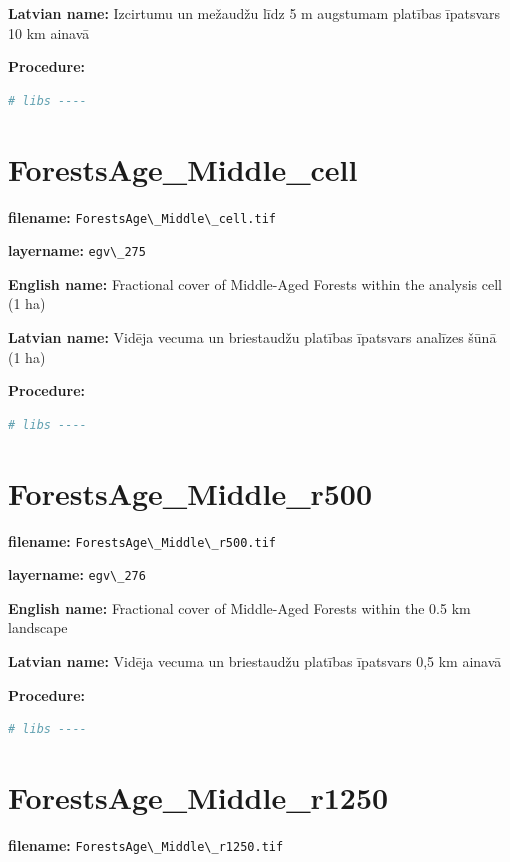 \documentclass[
]{book}
\newcommand{\passthrough}[1]{#1}
\begin{document}
\textbf{Latvian name:} Izcirtumu un mežaudžu līdz 5 m augstumam platības īpatsvars 10 km ainavā

\textbf{Procedure:}

\begin{lstlisting}[language=R]
# libs ----
\end{lstlisting}

\section{ForestsAge\_Middle\_cell}\label{ch06.275}

\textbf{filename:} \passthrough{\lstinline!ForestsAge\_Middle\_cell.tif!}

\textbf{layername:} \passthrough{\lstinline!egv\_275!}

\textbf{English name:} Fractional cover of Middle-Aged Forests within the analysis cell (1 ha)

\textbf{Latvian name:} Vidēja vecuma un briestaudžu platības īpatsvars analīzes šūnā (1 ha)

\textbf{Procedure:}

\begin{lstlisting}[language=R]
# libs ----
\end{lstlisting}

\section{ForestsAge\_Middle\_r500}\label{ch06.276}

\textbf{filename:} \passthrough{\lstinline!ForestsAge\_Middle\_r500.tif!}

\textbf{layername:} \passthrough{\lstinline!egv\_276!}

\textbf{English name:} Fractional cover of Middle-Aged Forests within the 0.5 km landscape

\textbf{Latvian name:} Vidēja vecuma un briestaudžu platības īpatsvars 0,5 km ainavā

\textbf{Procedure:}

\begin{lstlisting}[language=R]
# libs ----
\end{lstlisting}

\section{ForestsAge\_Middle\_r1250}\label{ch06.277}

\textbf{filename:} \passthrough{\lstinline!ForestsAge\_Middle\_r1250.tif!}
\end{document}

